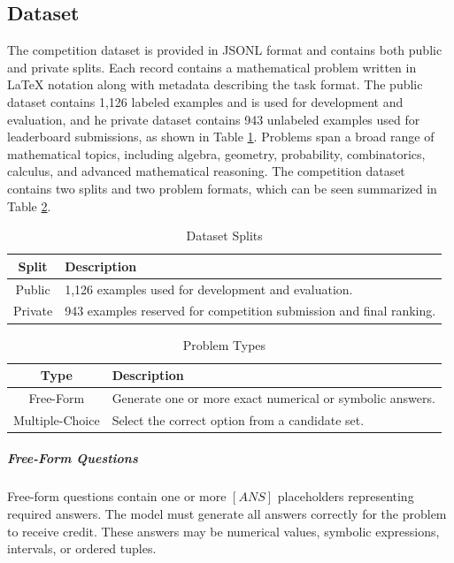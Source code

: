 \documentclass{article}
\begin{document}
\subsection{Dataset}
\label{sec:methods_dataset}
The competition dataset is provided in JSONL format and contains both public and private splits. Each record contains a mathematical problem written in \LaTeX\text{} notation along with metadata describing the task format. The public dataset contains 1,126 labeled examples and is used for development and evaluation, and he private dataset contains 943 unlabeled examples used for leaderboard submissions, as shown in Table \ref{tab:dataset_splits}.  Problems span a broad range of mathematical topics, including algebra, geometry, probability, combinatorics, calculus, and advanced mathematical reasoning. The competition dataset contains two splits and two problem formats, which can be seen summarized in Table \ref{tab:problem_types}.

\begin{table}[h]
\centering
\renewcommand{\arraystretch}{1.3}
\begin{tabular}{cp{5cm}}
\hline
\textbf{Split} & \textbf{Description} \\
\hline
Public & 1,126 examples used for development and evaluation. \\
Private & 943 examples reserved for competition submission and final ranking. \\
\hline
\end{tabular}
\caption{Dataset Splits}
\label{tab:dataset_splits}
\end{table}

\begin{table}[h]
\centering
\renewcommand{\arraystretch}{1.3}
\begin{tabular}{cp{8cm}}
\hline
\textbf{Type} & \textbf{Description} \\
\hline
Free-Form & Generate one or more exact numerical or symbolic answers. \\
Multiple-Choice & Select the correct option from a candidate set. \\
\hline
\end{tabular}
\caption{Problem Types}
\label{tab:problem_types}
\end{table}

\subparagraph{Free-Form Questions} Free-form questions contain one or more $[ANS]$ placeholders representing required answers. The model must generate all answers correctly for the problem to receive credit. These answers may be numerical values, symbolic expressions, intervals, or ordered tuples.
\end{document}

